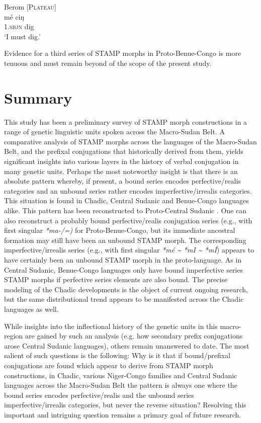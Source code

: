 \documentclass[output=paper]{langsci/langscibook}
\begin{document}
\ea\label{ex:anderson:77}
Berom  \citep[300]{Bouquiaux1970}        \textsc{[Plateau]}\\
\gll mé    ciŋ\\
1.\textsc{sbjn}  dig\\
\glt `I must dig.'
\z

Evidence for a third series of STAMP morphs in Proto-Benue-Congo is more tenuous and must remain beyond of the scope of the present study.

\section{Summary}\label{sec:Anderson:10}

This study has been a preliminary survey of STAMP morph constructions in a range of genetic linguistic units spoken across the Macro-Sudan Belt. A comparative analysis of STAMP morphs across the languages of the Macro-Sudan Belt, and the prefixal conjugations that historically derived from them, yields significant insights into various layers in the history of verbal conjugation in many genetic units. Perhaps the most noteworthy insight is that there is an absolute pattern whereby, if present, a bound series encodes perfective/realis categories and an unbound series rather encodes imperfective/irrealis categories. This situation is found in Chadic, Central Sudanic and Benue-Congo languages alike. This pattern has been reconstructed to Proto-Central Sudanic \citep{Anderson2015}. One can also reconstruct a probably bound perfective/realis conjugation series (e.g., with first singular \textit{*ma-/=)} for Proto-Benue-Congo, but its immediate ancestral formation may still have been an unbound STAMP morph. The corresponding imperfective/irrealis series (e.g., with first singular \textit{*mé {\textasciitilde} *mI {\textasciitilde} *mÍ}) appears to have certainly been an unbound STAMP morph in the proto-language. As in Central Sudanic, Benue-Congo languages only have bound imperfective series STAMP morphs if perfective series elements are also bound. The precise modeling of the Chadic developments is the object of current ongoing research, but the same distributional trend appears to be manifested across the Chadic languages as well. 

While insights into the inflectional history of the genetic units in this macro-region are gained by such an analysis (e.g. how secondary prefix conjugations arose Central Sudanic languages), others remain unanswered to date. The most salient of such questions is the following: Why is it that if bound/prefixal conjugations are found which appear to derive from STAMP morph constructions, in Chadic, various Niger-Congo families and Central Sudanic languages across the Macro-Sudan Belt the pattern is always one where the bound series encodes perfective/realis and the unbound series imperfective/irrealis categories, but never the reverse situation? Resolving this important and intriguing question remains a primary goal of future research. 
\end{document}
